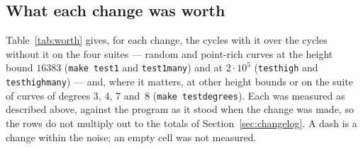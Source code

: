 \documentclass[12pt,a4paper,oneside]{amsart}
\begin{document}
\subsection{What each change was worth}\label{app:worth}

Table~\ref{tab:worth} gives, for each change, the cycles with it over the
cycles without it on the four suites --- random and point-rich curves at
the height bound $16383$ (\texttt{make test1} and \texttt{test1many}) and at
$2\cdot10^5$ (\texttt{testhigh} and \texttt{testhighmany}) --- and, where it
matters, at other height bounds or on the suite of curves of degrees 3, 4,
7 and~8 (\texttt{make testdegrees}). Each was measured as described above,
against the program as it stood when the change was made, so the rows do
not multiply out to the totals of Section~\ref{sec:changelog}. A dash is a
change within the noise; an empty cell was not measured.
\end{document}
